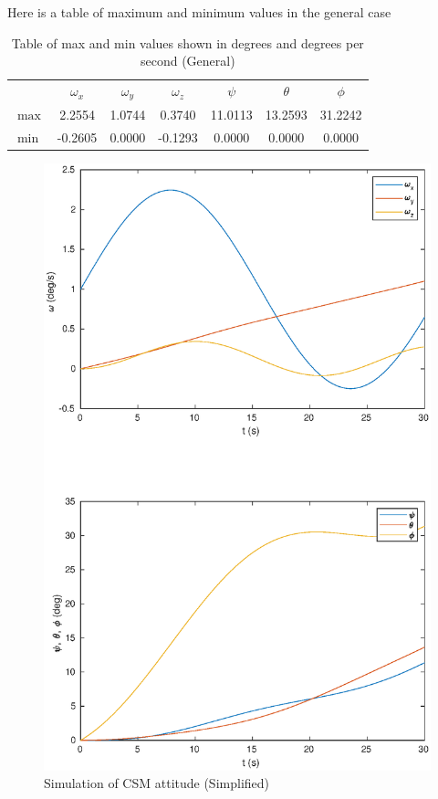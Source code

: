 \documentclass[a4paper]{article}
\begin{document}
\begin{enumerate}[a.]
    Here is a table of maximum and minimum values in the general case
    \begin{table}[H]
      \centering
      \begin{tabular}{lcccccc}
        & $\omega_x$ & $\omega_y$ & $\omega_z$ & $\psi$ & $\theta$ & $\phi$ \\
        $\max$ &  2.2554 & 1.0744 & 0.3740 & 11.0113 & 13.2593 & 31.2242\\
        $\min$ & -0.2605 & 0.0000 & -0.1293 & 0.0000 & 0.0000 & 0.0000 \\
      \end{tabular}
      \caption{Table of max and min values shown in degrees and degrees per second (General)}
    \end{table}

    \begin{figure}[H]
    \begin{center}
      \includegraphics[scale=0.7]{task_c_simplified.eps}
    \end{center}
    \caption{Simulation of CSM attitude (Simplified)}
    \label{fig:task_c_simplified}
    \end{figure}


\end{enumerate}
\end{document}
